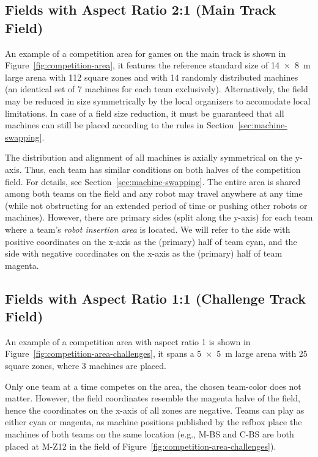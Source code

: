 \documentclass[12pt,twoside]{article}
\newcommand{\refsec}[1]{Section~\ref{#1}}
\newcommand{\reffig}[1]{Figure~\ref{#1}}
\begin{document}
\subsection{Fields with Aspect Ratio 2:1 (Main Track Field)}
\label{sec:competition-area}
An example of a competition area for games on the main track is shown in
\reffig{fig:competition-area}, it
features the reference standard size of \SI{14 x 8}{\metre} %
large arena with 112 square zones
and with 14 randomly distributed machines (an identical set of 7 machines for
each team exclusively).
Alternatively, the field may be reduced in size symmetrically by the local
organizers to accomodate local limitations.
In case of a field size reduction, it must be guaranteed that all machines
can still be placed according to the rules in \refsec{sec:machine-swapping}.

The distribution and alignment of all machines is axially symmetrical
on the y-axis. Thus, each team has similar conditions on both halves of
the competition field.
For details, see \refsec{sec:machine-swapping}.
The entire area is shared among both teams on the field and any robot may travel
anywhere at any time (while not obstructing for an extended period of
time or pushing other robots or machines).
However, there are primary sides (split along the y-axis) for each team where
a team's \textit{robot insertion area} is located.
We will refer to the side with positive coordinates on the x-axis as the
(primary) half of team cyan, and the side with negative coordinates on the
x-axis as the (primary) half of team magenta.

\subsection{Fields with Aspect Ratio 1:1 (Challenge Track Field)}
\label{sec:competition-area-aspect-ratio-1}
An example of a competition area with aspect ratio 1 is shown in
\reffig{fig:competition-area-challenges},
it spans a \SI{5 x 5}{\metre} large %
arena with 25 square zones, where 3 machines are placed.

Only one team at a time competes on the area, the chosen team-color
does not matter. However, the field coordinates resemble the magenta halve
of the field, hence the coordinates on the x-axis of all zones are negative.
Teams can play as either cyan or magenta, as machine positions published by
the \ac{refbox} place the machines of both teams on the same location
(e.g., M-BS and C-BS are both placed at M-Z12 in the field of
\reffig{fig:competition-area-challenges}).
\end{document}
